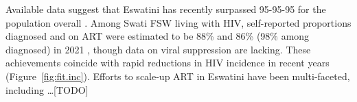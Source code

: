 Available data suggest that
Eswatini has recently surpassed 95-95-95 for the population overall \cite{SHIMS3}.
Among Swati FSW living with HIV, self-reported proportions diagnosed and on ART
were estimated to be 88\% and 86\% (98\% among diagnosed) in 2021 \cite{EswIBBS2022},
though data on viral suppression are lacking.
These achievements coincide with rapid reductions in HIV incidence in recent years
\cite{SHIMS1,SHIMS2,SHIMS3} (Figure~\ref{fig:fit.inc}).
Efforts to scale-up ART in Eswatini have been multi-faceted, including \dots [TODO]
